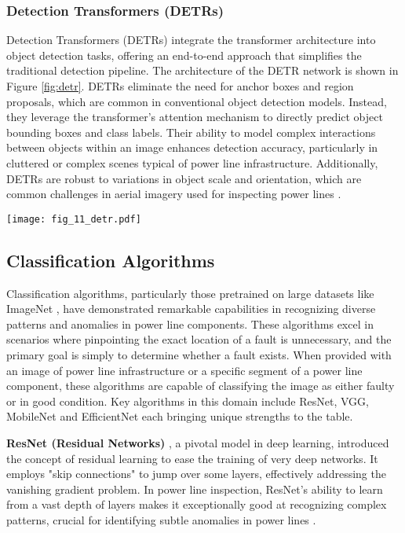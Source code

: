 \subsubsection{Detection Transformers (DETRs)}

Detection Transformers (DETRs) \cite{carion2020end} integrate the transformer architecture into object detection tasks, offering an end-to-end approach that simplifies the traditional detection pipeline. The architecture of the DETR network is shown in Figure \ref{fig:detr}. DETRs eliminate the need for anchor boxes and region proposals, which are common in conventional object detection models. Instead, they leverage the transformer’s attention mechanism to directly predict object bounding boxes and class labels. Their ability to model complex interactions between objects within an image enhances detection accuracy, particularly in cluttered or complex scenes typical of power line infrastructure. Additionally, DETRs are robust to variations in object scale and orientation, which are common challenges in aerial imagery used for inspecting power lines \cite{zhang_pa_detr_2023, jain2024transfer}. \\

\begin{figure*}[htb]
    \centering
    \texttt{[image: fig\_11\_detr.pdf]}
    \caption{The simplified block diagram of the original DETR network \cite{carion2020end}}
    \label{fig:detr}
\end{figure*}

\subsection{Classification Algorithms}
Classification algorithms, particularly those pretrained on large datasets like ImageNet \cite{5206848}, have demonstrated remarkable capabilities in recognizing diverse patterns and anomalies in power line components. These algorithms excel in scenarios where pinpointing the exact location of a fault is unnecessary, and the primary goal is simply to determine whether a fault exists. When provided with an image of power line infrastructure or a specific segment of a power line component, these algorithms are capable of classifying the image as either faulty or in good condition. Key algorithms in this domain include ResNet, VGG, MobileNet and EfficientNet each bringing unique strengths to the table. 
 
\textbf{ResNet (Residual Networks)} \cite{he_2023_deep}, a pivotal model in deep learning, introduced the concept of residual learning to ease the training of very deep networks. It employs "skip connections" to jump over some layers, effectively addressing the vanishing gradient problem. In power line inspection, ResNet's ability to learn from a vast depth of layers makes it exceptionally good at recognizing complex patterns, crucial for identifying subtle anomalies in power lines \cite{wei_online_2022, cao_accurate_2023, luo_ultrasmall_2023}.

